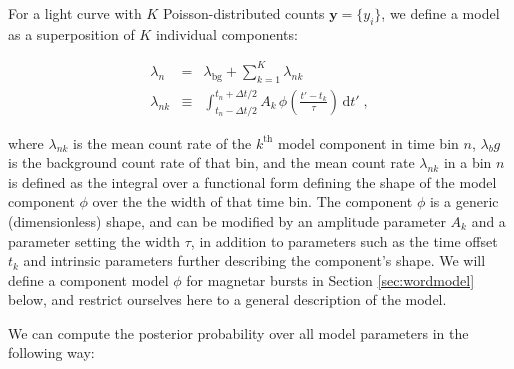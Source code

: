 \documentclass[12pt]{emulateapj}
\newcommand{\given}{\,|\,}
\newcommand{\dd}{\mathrm{d}}
\newcommand{\counts}{y}
\newcommand{\pars}{\theta}
\newcommand{\mean}{\lambda}
\newcommand{\Poisson}{{\mathcal P}}
\newcommand{\bg}{\mathrm{bg}}
\newcommand{\word}{\phi}
\begin{document}
For a light curve with $K$ Poisson-distributed counts $\bm{\counts} = \{\counts_i\}$, we define a model as a superposition of $K$ individual components:

\begin{eqnarray}
\mean_n &=& \mean_{\bg} + \sum_{k=1}^K \mean_{nk}
\\
\mean_{nk} &\equiv& \int_{t_n-\Delta t/2}^{t_n+\Delta t/2} A_k\,\word(\frac{t'-t_k}{\tau})\,\dd t' \; ,
\end{eqnarray}

where $\mean_{nk}$ is the mean count rate of the $k^{\mathrm{th}}$ model component in time bin $n$, 
$\mean_bg$ is the background count rate of that bin,
and the mean count rate $\mean_{nk}$ in a bin $n$ is defined as the integral over a functional form defining the shape of
the model component $\word$ over the the width of that time bin. The component $\word$ is a generic (dimensionless) shape,
and can be modified by an amplitude parameter $A_k$ and a parameter setting the width $\tau$, in addition to
parameters such as the time offset $t_k$ and intrinsic parameters further describing the component's shape.
We will define a component model $\word$ for magnetar bursts in Section \ref{sec:wordmodel} below, and
restrict ourselves here to a general description of the model.
 
  
We can compute the posterior probability over all model parameters in the following way:
\end{document}
